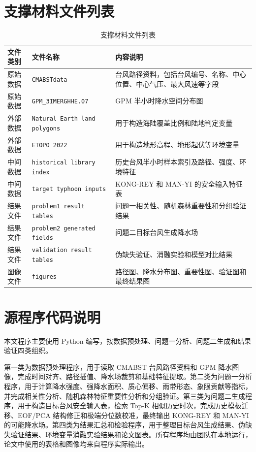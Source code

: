 \documentclass[UTF8,a4paper,zihao=5,fontset=fandol]{ctexart}
\numberwithin{equation}{section}
\numberwithin{figure}{section}
\numberwithin{table}{section}
\begin{document}
\section{支撑材料文件列表}
\begin{table}[H]
  \centering
  \caption{支撑材料文件列表}
  \begin{tabularx}{\linewidth}{lXX}
    \toprule
    文件类别 & 文件名称 & 内容说明 \\
    \midrule
    原始数据 & \texttt{CMABSTdata} & 台风路径资料，包括台风编号、名称、中心位置、中心气压、最大风速等字段 \\
    原始数据 & \texttt{GPM\_3IMERGHHE.07} & GPM 半小时降水空间分布图 \\
    外部数据 & \texttt{Natural Earth land polygons} & 用于构造海陆覆盖比例和陆地判定变量 \\
    外部数据 & \texttt{ETOPO 2022} & 用于构造地形高程、地形起伏等环境变量 \\
    中间数据 & \texttt{historical library index} & 历史台风半小时样本索引及路径、强度、环境特征 \\
    中间数据 & \texttt{target typhoon inputs} & KONG-REY 和 MAN-YI 的安全输入特征表 \\
    结果文件 & \texttt{problem1 result tables} & 问题一相关性、随机森林重要性和分组验证结果 \\
    结果文件 & \texttt{problem2 generated fields} & 问题二目标台风生成降水场 \\
    结果文件 & \texttt{validation result tables} & 伪缺失验证、消融实验和模型对比结果 \\
    图像文件 & \texttt{figures} & 路径图、降水分布图、重要性图、验证图和最终结果图 \\
    \bottomrule
  \end{tabularx}
\end{table}

\section{源程序代码说明}
本文程序主要使用 Python 编写，按数据预处理、问题一分析、问题二生成和结果验证四类组织。

第一类为数据预处理程序，用于读取 CMABST 台风路径资料和 GPM 降水图像，完成时间对齐、路径插值、降水场裁剪和基础特征提取。第二类为问题一分析程序，用于计算降水强度、强降水面积、质心偏移、雨带形态、象限贡献等指标，并完成相关性分析、随机森林特征重要性分析和分组验证。第三类为问题二生成程序，用于构造目标台风安全输入表，检索 Top-K 相似历史时次，完成历史模板迁移、EOF/PCA 结构修正和极端分位数校准，最终输出 KONG-REY 和 MAN-YI 的可能降水场。第四类为结果汇总和检验程序，用于整理目标台风生成结果、伪缺失验证结果、环境变量消融实验结果和论文图表。所有程序均由团队在本地运行，论文中使用的表格和图像均来自程序实际输出。
\end{document}
